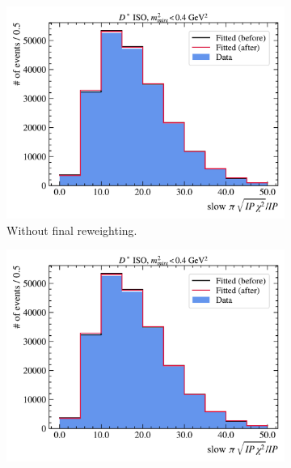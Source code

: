 
\begin{figure}[htb]
    \begin{subfigure}[t]{0.32\textwidth}
        \centering
        \includegraphics[width=\textwidth]{./figs-mc-correction/reweighting-final/plot_step12-Dst_iso-spi_comp.pdf}
        \caption{Without final reweighting.}
        \label{fig:worse-pulls-after-final-rwt:no-final-rwt}
    \end{subfigure}
    \begin{subfigure}[t]{0.32\textwidth}
        \centering
        \includegraphics[width=\textwidth]{./figs-mc-correction/reweighting-final/plot_step12-Dst_iso-spi_comp.pdf}

\end{subfigure}
\end{figure}
